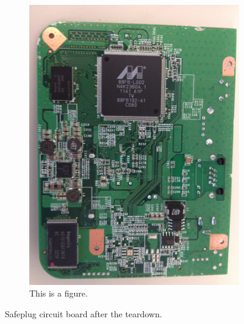 \begin{figure}[htb]
\begin{subfigure}[b]{.3\textwidth}
\includegraphics[width=\textwidth]{safeplug_bottom}
\caption{This is a figure.}
\label{fig:bottom}
\end{subfigure}
\caption{Safeplug circuit board after the teardown.}
\end{figure}
